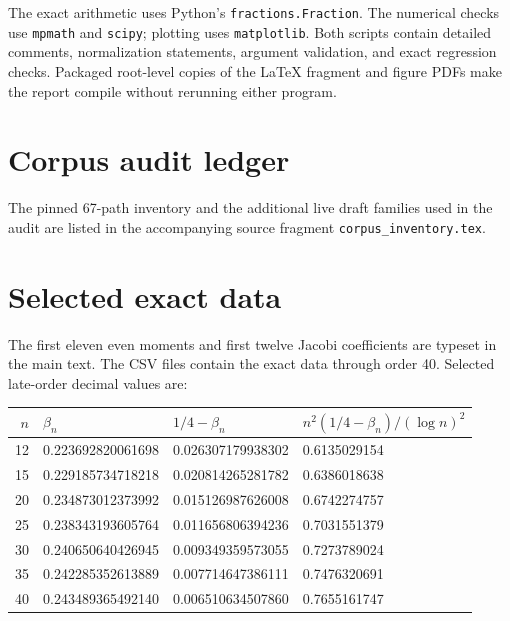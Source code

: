 \documentclass[11pt]{article}
\theoremstyle{definition}
\theoremstyle{remark}
\begin{document}
The exact arithmetic uses Python's \texttt{fractions.Fraction}.  The numerical checks use
\texttt{mpmath} and \texttt{scipy}; plotting uses \texttt{matplotlib}.  Both scripts contain
detailed comments, normalization statements, argument validation, and exact regression
checks.  Packaged root-level copies of the LaTeX fragment and figure PDFs make the report
compile without rerunning either program.

\section{Corpus audit ledger}\label{p6:app:corpus}

The pinned 67-path inventory and the additional live draft families used in the audit are
listed in the accompanying source fragment \texttt{corpus\_inventory.tex}.



\section{Selected exact data}\label{p6:app:data}

The first eleven even moments and first twelve Jacobi coefficients are typeset in the main
text.  The CSV files contain the exact data through order 40.  Selected late-order decimal
values are:
\begin{center}
\begin{tabular}{rlll}
\toprule
\(n\) & \(\beta_n\) & \(1/4-\beta_n\) &
\(n^2(1/4-\beta_n)/(\log n)^2\) \\
\midrule
12 & 0.223692820061698 & 0.026307179938302 & 0.6135029154 \\
15 & 0.229185734718218 & 0.020814265281782 & 0.6386018638 \\
20 & 0.234873012373992 & 0.015126987626008 & 0.6742274757 \\
25 & 0.238343193605764 & 0.011656806394236 & 0.7031551379 \\
30 & 0.240650640426945 & 0.009349359573055 & 0.7273789024 \\
35 & 0.242285352613889 & 0.007714647386111 & 0.7476320691 \\
40 & 0.243489365492140 & 0.006510634507860 & 0.7655161747 \\
\bottomrule
\end{tabular}
\end{center}
\end{document}
